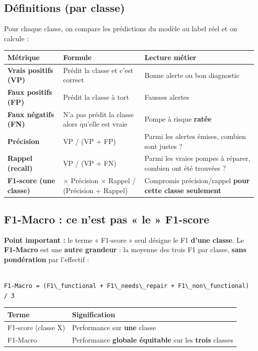 \documentclass[11pt,a4paper]{report}
\begin{document}
\subsection{Définitions (par classe)}

Pour chaque classe, on compare les prédictions du modèle au label réel et on calcule :

{\small
\begin{longtable}{@{}>{\raggedright\arraybackslash}p{}>{\raggedright\arraybackslash}p{}>{\raggedright\arraybackslash}p{}@{}}
\toprule
\rowcolor{EHTPTableHead}Métrique & Formule & Lecture métier \\
\midrule
\textbf{Vrais positifs (VP)} & Prédit la classe et c'est correct & Bonne alerte ou bon diagnostic \\
\textbf{Faux positifs (FP)} & Prédit la classe à tort & Fausses alertes \\
\textbf{Faux négatifs (FN)} & N'a pas prédit la classe alors qu'elle est vraie & Pompe à risque \textbf{ratée} \\
\textbf{Précision} & VP / (VP + FP) & Parmi les alertes émises, combien sont justes ? \\
\textbf{Rappel (recall)} & VP / (VP + FN) & Parmi les vraies pompes à réparer, combien ont été trouvées ? \\
\textbf{F1-score (une classe)} & 2 × Précision × Rappel / (Précision + Rappel) & Compromis précision/rappel \textbf{pour cette classe seulement} \\
\bottomrule
\end{longtable}
}

\subsection{F1-Macro : ce n'est pas « le » F1-score}

\textbf{Point important :} le terme « F1-score » seul désigne le F1 \textbf{d'une classe}. Le \textbf{F1-Macro} est une \textbf{autre grandeur} : la moyenne des trois F1 par classe, \textbf{sans pondération} par l'effectif :

\begin{lstlisting}

F1-Macro = (F1\_functional + F1\_needs\_repair + F1\_non\_functional) / 3

\end{lstlisting}

{\small
\begin{longtable}{@{}>{\raggedright\arraybackslash}p{}>{\raggedright\arraybackslash}p{}@{}}
\toprule
\rowcolor{EHTPTableHead}Terme & Signification \\
\midrule
F1-score (classe X) & Performance sur \textbf{une} classe \\
F1-Macro & Performance \textbf{globale équitable} sur les \textbf{trois} classes \\
\bottomrule
\end{longtable}
}
\end{document}
